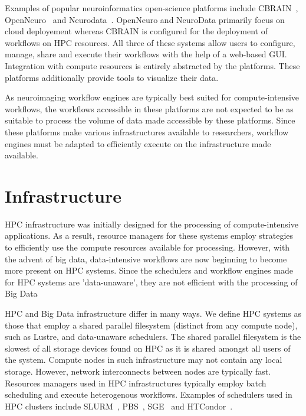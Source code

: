 \documentclass{report}
\begin{document}
            Examples of popular neuroinformatics open-science platforms include 
            CBRAIN~\cite{10.3389/fninf.2014.00054}, 
            OpenNeuro~\cite{gorgolewski2017openneuro} and 
            Neurodata~\cite{burns2018community}. OpenNeuro and NeuroData primarily focus on
            cloud deployement whereas CBRAIN is configured for the deployment
            of workflows on HPC resources. All three of these systems allow 
            users to configure, manage, share and execute their workflows with 
            the help of a web-based GUI. Integration with compute resources is
            entirely abstracted by the platforms. These platforms additionally
            provide tools to visualize their data.

            As neuroimaging workflow engines are typically best suited for 
            compute-intensive workflows, the workflows accessible in these 
            platforms are not expected to be as suitable to process the 
            volume of data made accessible by these platforms. Since these 
            platforms make various infrastructures available to researchers, 
            workflow engines must be adapted to efficiently execute on the 
            infrastructure made available.
            
        \section{Infrastructure}\label{infrastructure}
            HPC infrastructure was initially designed for the processing of 
            compute-intensive applications. As a result,
            resource managers for these systems employ
            strategies to efficiently use the compute resources available for 
            processing. However, with the advent of big data, data-intensive 
            workflows are now beginning to become more present on HPC systems.
            Since the schedulers and workflow engines made for HPC systems are 
            'data-unaware', they are not efficient with the processing of Big
            Data

            HPC and Big Data infrastructure differ in many ways. We define HPC 
            systems as those that employ a shared parallel 
            filesystem (distinct from any compute node), such as Lustre, and 
            data-unaware schedulers.
            The shared parallel filesystem is the slowest of
            all storage devices found on HPC as it is shared amongst all users 
            of the system.
            Compute nodes in such infrastructure may not contain any local 
            storage. However, network interconnects between nodes are typically 
            fast.
            Resources managers used in HPC infrastructures typically employ 
            batch scheduling and execute heterogenous workflows. 
            Examples of schedulers used in HPC clusters 
            include SLURM~\cite{yoo2003slurm}, 
            PBS~\cite{10.1007/3-540-60153-8_34}, SGE~\cite{SGE} and 
            HTCondor~\cite{htcondor}.
\end{document}

